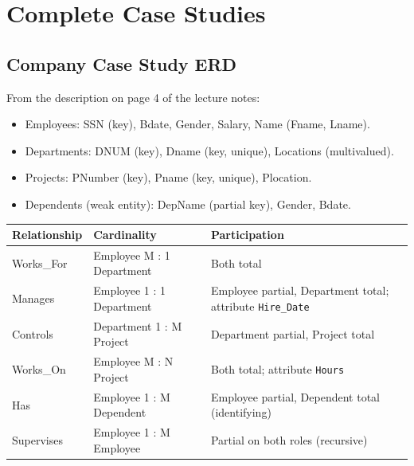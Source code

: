 \documentclass[a4paper,11pt]{article}
\newenvironment{keepblock}
  {\par\noindent\begin{minipage}{\linewidth}\setlength{\parskip}{0.4em}}
  {\end{minipage}\par\bigskip}
\begin{document}
\clearpage
\begin{keepblock}
    \section{Complete Case Studies}

    \subsection{Company Case Study ERD}
    From the description on page 4 of the lecture notes:
    \begin{itemize}
        \item Employees: SSN (key), Bdate, Gender, Salary, Name (Fname, Lname).
        \item Departments: DNUM (key), Dname (key, unique), Locations (multivalued).
        \item Projects: PNumber (key), Pname (key, unique), Plocation.
        \item Dependents (weak entity): DepName (partial key), Gender, Bdate.
    \end{itemize}

    \begin{center}
        \centering
        \small
        \begin{tabularx}{\textwidth}{l l X}
            \toprule
            \textbf{Relationship} & \textbf{Cardinality}      & \textbf{Participation}                                            \\
            \midrule
            Works\_For            & Employee M : 1 Department & Both total                                                        \\
            Manages               & Employee 1 : 1 Department & Employee partial, Department total; attribute \texttt{Hire\_Date} \\
            Controls              & Department 1 : M Project  & Department partial, Project total                                 \\
            Works\_On             & Employee M : N Project    & Both total; attribute \texttt{Hours}                              \\
            Has                   & Employee 1 : M Dependent  & Employee partial, Dependent total (identifying)                   \\
            Supervises            & Employee 1 : M Employee   & Partial on both roles (recursive)                                 \\
            \bottomrule
        \end{tabularx}
    \end{center}

    \begin{center}
        \centering
        \resizebox{\textwidth}{!}{\CompanyERD}
        \vspace{0.3cm}
    \end{center}
\end{keepblock}
\end{document}
